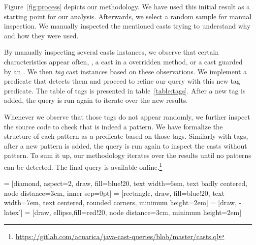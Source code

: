 Figure~\ref{fig:process} depicts our methodology.
We have used this initial result as a starting point for our analysis.
Afterwards, we select a random sample for manual inspection.
We manually inspected the mentioned casts trying to understand why and how they were used.

By manually inspecting several casts instances, we observe that certain characteristics appear often, \eg{}, a cast in a overridden method, or a cast guarded by an .
We then \emph{tag} cast instances based on these observations.
We implement a \ql{} predicate that detects them and proceed to refine our query with this new tag predicate.
The table of tags is presented in table~\ref{table:tags}.
After a new tag is added, the query is run again to iterate over the new results.

Whenever we observe that those tags do not appear randomly, we further inspect the source code to check that is indeed a pattern.
We have formalize the structure of each pattern as a \ql{} predicate based on those tags.
Similarly with tags, after a new pattern is added, the query is run again to inspect the casts without pattern.
To sum it up, our methodology iterates over the results until no patterns can be detected.
The final \ql{} query is available online.\footnote{\url{https://gitlab.com/acuarica/java-cast-queries/blob/master/casts.ql}}

 = [diamond, aspect=2, draw, fill=blue!20, 
    text width=6em, text badly centered, node distance=3cm, inner sep=0pt]
 = [rectangle, draw, fill=blue!20, 
    text width=7em, text centered, rounded corners, minimum height=2em]
 = [draw, -latex']
 = [draw, ellipse,fill=red!20, node distance=3cm,
    minimum height=2em]

